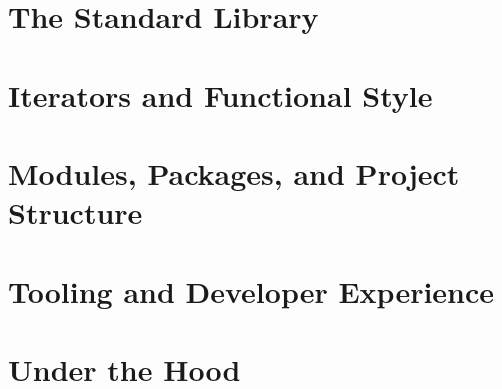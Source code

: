\part{The Standard Library}





\part{Iterators and Functional Style}



\part{Modules, Packages, and Project Structure}



\part{Tooling and Developer Experience}




\part{Under the Hood}






